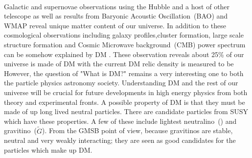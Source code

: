 {\paragraph*{}
Galactic and supernovae observations using the Hubble and a host of other telescope as well as results from Baryonic Acoustic Oscillation~(BAO) and WMAP reveal unique matter content of our universe. In addition to these cosmological observations including galaxy profiles,cluster formation, large scale structure formation and Cosmic Microwave background~(CMB) power spectrum can be somehow explained by DM \cite{WMAP}. These observation reveals about 25\% of our universe is made of DM with the current DM relic density is measured to be  %
However, the question of "What is DM?" remains a very interesting one to both the particle physics astronomy society.
Understanding DM and the rest of our universe will be crucial for future developments in high energy physics from both theory and experimental fronts.  
A possible property of DM is that they must be made of up long lived neutral particles. There are candidate particles from SUSY which have these properties. A few of these include lightest neutralino~(\PSneutralinoOne) and gravitino~($\tilde{G}$). From the GMSB point of view, because gravitinos are stable, neutral and very weakly interacting; they are seen as good candidates for the particles which make up DM. 
}
